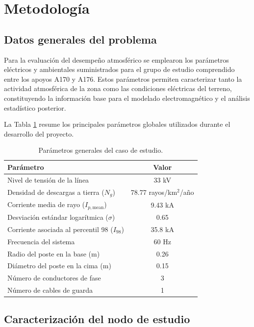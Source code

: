 \documentclass[12pt,letterpaper]{article}
\begin{document}
\section{Metodología}

\subsection{Datos generales del problema}
Para la evaluación del desempeño atmosférico se emplearon los parámetros eléctricos y ambientales suministrados para el grupo de estudio comprendido entre los apoyos A170 y A176. Estos parámetros permiten caracterizar tanto la actividad atmosférica de la zona como las condiciones eléctricas del terreno, constituyendo la información base para el modelado electromagnético y el análisis estadístico posterior.

La Tabla \ref{tab:datos_generales} resume los principales parámetros globales utilizados durante el desarrollo del proyecto.

\begin{table}[H]
\centering
\caption{Parámetros generales del caso de estudio.}
\label{tab:datos_generales}
\renewcommand{\arraystretch}{1.2}
\begin{tabular}{lc}
\toprule
Parámetro & Valor \\
\midrule
Nivel de tensión de la línea & 33 kV \\
Densidad de descargas a tierra ($N_g$) & 78.77 rayos/km$^2$/año \\
Corriente media de rayo ($I_{p,\mathrm{mean}}$) & 9.43 kA \\
Desviación estándar logarítmica ($\sigma$) & 0.65 \\
Corriente asociada al percentil 98 ($I_{98}$) & 35.8 kA \\
Frecuencia del sistema & 60 Hz \\
Radio del poste en la base (m) & 0.26 \\
Diámetro del poste en la cima (m) & 0.15 \\
Número de conductores de fase & 3  \\
Número de cables de guarda & 1 \\
\bottomrule
\end{tabular}
\end{table}

\subsection{Caracterización del nodo de estudio}
\end{document}
